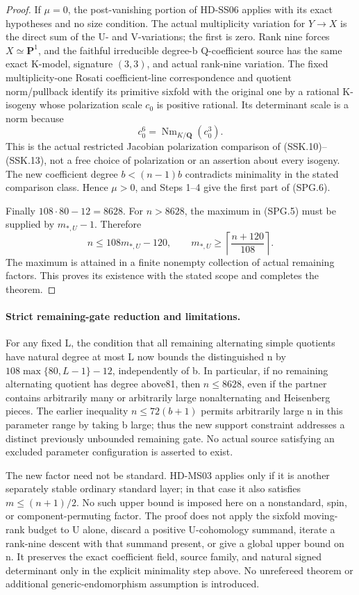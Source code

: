 \begin{proof}
If \(\mu=0\), the post-vanishing portion of HD-SS06 applies with
its exact hypotheses and no size condition.  The actual multiplicity
variation for \(Y\to X\) is the direct sum of the U- and V-variations;
the first is zero.  Rank nine forces \(X\simeq\mathbf P^1\),
and the faithful irreducible degree-b Q-coefficient source has the
same exact K-model, signature \((3,3)\), and actual rank-nine variation.
The fixed multiplicity-one Rosati coefficient-line correspondence
and quotient norm/pullback identify its primitive sixfold with the
original one by a rational K-isogeny whose polarization scale
\(c_0\) is positive rational.  Its determinant scale is a norm because
\[
                           c_0^6
                   =\operatorname{Nm}_{K/\mathbf Q}(c_0^3).
 \tag{SPG.14}
\]
This is the actual restricted Jacobian polarization comparison of
(SSK.10)--(SSK.13), not a free choice of polarization or an assertion
about every isogeny.  The new coefficient degree \(b<(n-1)b\)
contradicts minimality in the stated comparison class.  Hence
\(\mu>0\), and Steps 1--4 give the first part of (SPG.6).

Finally \(108\cdot80-12=8628\).  For \(n>8628\), the maximum
in (SPG.5) must be supplied by \(m_{*,U}-1\).  Therefore
\[
                      n\le108m_{*,U}-120,
       \qquad m_{*,U}\ge\left\lceil\frac{n+120}{108}\right\rceil.
 \tag{SPG.15}
\]
The maximum is attained in a finite nonempty collection of actual
remaining factors.  This proves its existence with the stated scope
and completes the theorem.
\end{proof}

\paragraph{Strict remaining-gate reduction and limitations.}
For any fixed L, the condition that all remaining alternating simple
quotients have natural degree at most L now bounds the distinguished n
by \(108\max\{80,L-1\}-12\), independently of b.  In particular,
if no remaining alternating quotient has degree above81, then \(n\le8628\),
even if the partner contains arbitrarily many or arbitrarily large
nonalternating and Heisenberg pieces.  The earlier inequality
\(n\le72(b+1)\) permits arbitrarily large n in this parameter range
by taking b large; thus the new support constraint addresses a distinct
previously unbounded remaining gate.  No actual source satisfying an
excluded parameter configuration is asserted to exist.

The new factor need not be standard.  HD-MS03 applies only if it is
another separately stable ordinary standard layer; in that case it
also satisfies \(m\le(n+1)/2\).  No such upper bound is imposed here
on a nonstandard, spin, or component-permuting factor.  The proof does
not apply the sixfold moving-rank budget to U alone, discard a positive
U-cohomology summand, iterate a rank-nine descent with that summand
present, or give a global upper bound on n.  It preserves the exact
coefficient field, source family, and natural signed determinant only
in the explicit minimality step above.  No unrefereed theorem or
additional generic-endomorphism assumption is introduced.
